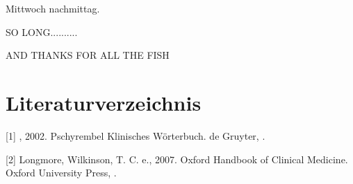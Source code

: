 \documentclass{article}
\begin{document}
Mittwoch nachmittag. 

\printindex
\listoffigures
SO LONG..........

AND THANKS FOR ALL THE FISH

\section[Literaturverzeichnis]{Literaturverzeichnis}
[1] , 2002. Pschyrembel Klinisches W\"orterbuch. de Gruyter, .

[2] Longmore, Wilkinson, T. C. e., 2007. Oxford Handbook of Clinical
Medicine. Oxford University Press, .
\end{document}

